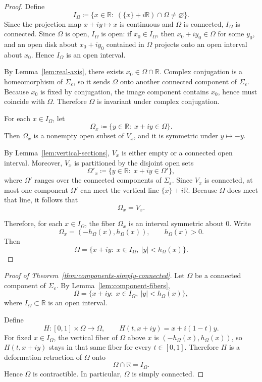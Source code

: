 \documentclass[11pt]{article}
\begin{document}
\begin{proof}
Define
\[
I_\Omega
\coloneqq
\{x\in\mathbb R:\; (\{x\}+i\mathbb R)\cap\Omega\neq\varnothing\}.
\]
Since the projection map \(x+iy\mapsto x\) is continuous and \(\Omega\) is connected, \(I_\Omega\) is connected. Since \(\Omega\) is open, \(I_\Omega\) is open: if \(x_0\in I_\Omega\), then \(x_0+iy_0\in\Omega\) for some \(y_0\), and an open disk about \(x_0+iy_0\) contained in \(\Omega\) projects onto an open interval about \(x_0\). Hence \(I_\Omega\) is an open interval.

By Lemma~\ref{lem:real-axis}, there exists \(x_0\in\Omega\cap\mathbb R\). Complex conjugation is a homeomorphism of \(\Sigma_\varepsilon\), so it sends \(\Omega\) onto another connected component of \(\Sigma_\varepsilon\). Because \(x_0\) is fixed by conjugation, the image component contains \(x_0\), hence must coincide with \(\Omega\). Therefore \(\Omega\) is invariant under complex conjugation.

For each \(x\in I_\Omega\), let
\[
\Omega_x
\coloneqq
\{y\in\mathbb R:\; x+iy\in\Omega\}.
\]
Then \(\Omega_x\) is a nonempty open subset of \(V_x\), and it is symmetric under \(y\mapsto -y\).

By Lemma~\ref{lem:vertical-sections}, \(V_x\) is either empty or a connected open interval. Moreover, \(V_x\) is partitioned by the disjoint open sets
\[
\Omega'_x\coloneqq \{y\in\mathbb R:\; x+iy\in\Omega'\},
\]
where \(\Omega'\) ranges over the connected components of \(\Sigma_\varepsilon\). Since \(V_x\) is connected, at most one component \(\Omega'\) can meet the vertical line \(\{x\}+i\mathbb R\). Because \(\Omega\) does meet that line, it follows that
\[
\Omega_x=V_x.
\]

Therefore, for each \(x\in I_\Omega\), the fiber \(\Omega_x\) is an interval symmetric about \(0\). Write
\[
\Omega_x=(-h_\Omega(x),h_\Omega(x)),
\qquad h_\Omega(x)>0.
\]
Then
\[
\Omega
=
\{x+iy:\; x\in I_\Omega,\ |y|<h_\Omega(x)\}.
\]
\end{proof}

\begin{proof}[Proof of Theorem~\ref{thm:components-simply-connected}]
Let \(\Omega\) be a connected component of \(\Sigma_\varepsilon\). By Lemma~\ref{lem:component-fibers},
\[
\Omega
=
\{x+iy:\; x\in I_\Omega,\ |y|<h_\Omega(x)\},
\]
where \(I_\Omega\subset\mathbb R\) is an open interval.

Define
\[
H:[0,1]\times\Omega\longrightarrow\Omega,
\qquad
H(t,x+iy)=x+i(1-t)y.
\]
For fixed \(x\in I_\Omega\), the vertical fiber of \(\Omega\) above \(x\) is \((-h_\Omega(x),h_\Omega(x))\), so \(H(t,x+iy)\) stays in that same fiber for every \(t\in[0,1]\). Therefore \(H\) is a deformation retraction of \(\Omega\) onto
\[
\Omega\cap\mathbb R=I_\Omega.
\]
Hence \(\Omega\) is contractible. In particular, \(\Omega\) is simply connected.
\end{proof}
\end{document}
